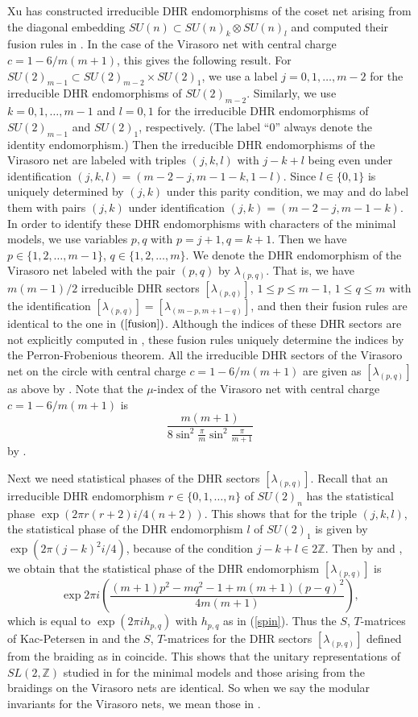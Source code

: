 \documentclass[12pt]{article}
\def\la{\lambda}
\def\Z{{\mathbb Z}}
\begin{document}
Xu has constructed irreducible DHR endomorphisms of the coset net arising
from the diagonal embedding $SU(n)\subset SU(n)_k\otimes SU(n)_l$
and computed their fusion rules in \cite[Theorem 4.6]{X4}.  In the
case of the Virasoro net with central charge $c=1-6/m(m+1)$,
this gives the following result.  For 
$SU(2)_{m-1}\subset SU(2)_{m-2}\times SU(2)_1$, we use a label
$j=0,1,\dots,m-2$ for the irreducible DHR endomorphisms of $SU(2)_{m-2}$.
Similarly, we use $k=0,1,\dots,m-1$ and $l=0,1$ for the
irreducible DHR endomorphisms of $SU(2)_{m-1}$ and $SU(2)_1$,
respectively.  (The label ``0'' always denote the identity endomorphism.)
Then the irreducible DHR endomorphisms of the Virasoro net are
labeled with triples $(j,k,l)$ with $j-k+l$ being even under
identification $(j,k,l)=(m-2-j,m-1-k,1-l)$.  
Since $l\in\{0,1\}$ is uniquely determined by $(j,k)$ under this
parity condition, we may and do label them with pairs $(j,k)$ under
identification $(j,k)=(m-2-j,m-1-k)$.  In order to identify
these DHR endomorphisms with characters of the minimal models,
we use variables $p,q$ with $p=j+1, q=k+1$.  Then we have
$p\in\{1,2,\dots,m-1\}$, $q\in\{1,2,\dots,m\}$.  We denote the
DHR endomorphism of the Virasoro net labeled with the pair $(p,q)$ 
by $\la_{(p,q)}$.  That is, we have $m(m-1)/2$ irreducible DHR sectors
$[\la_{(p,q)}]$, $1\le p\le m-1$, $1\le q\le m$ with the identification
$[\la_{(p,q)}]=[\la_{(m-p,m+1-q)}]$, and then their fusion rules are
identical to the one in $(\ref{fusion})$.
Although the indices of these DHR sectors are not explicitly computed
in \cite{X4}, these fusion rules uniquely determine the indices by the
Perron-Frobenious theorem.
All the irreducible DHR sectors of the Virasoro net on the circle with
central charge $c=1-6/m(m+1)$ are given as $[\la_{(p,q)}]$ as above
by \cite[Proposition 3.7]{X5}.  Note that the $\mu$-index of 
the Virasoro net with central charge $c=1-6/m(m+1)$ is
$$\frac{m(m+1)}{8\sin^2{\frac{\pi}{m}} \sin^2{\frac{\pi}{m+1}}}$$
by \cite[Lemma 3.6]{X5}.

Next we need statistical phases of the DHR sectors $[\la_{(p,q)}]$.
Recall that an irreducible DHR endomorphism $r\in\{0,1,\dots,n\}$
of $SU(2)_n$ has the statistical phase
$\exp (2\pi r(r+2)i/4(n+2))$.  This shows that for the triple
$(j,k,l)$, the statistical phase of the DHR endomorphism $l$ of
$SU(2)_1$ is given by $\exp (2\pi (j-k)^2 i/4)$, because of the
condition $j-k+l\in 2\Z$.  Then by \cite[Theorem 4.6.(i)]{X6}
and \cite[Lemma 6.1]{BE4}, we obtain that
the statistical phase of the DHR endomorphism $[\la_{(p,q)}]$ is 
$$\exp 2\pi i \left(\dfrac{(m+1)p^2-mq^2-1+m(m+1)(p-q)^2}{4m(m+1)}\right),$$
which is equal to $\exp(2\pi ih_{p,q})$
with $h_{p,q}$ as in (\ref{spin}).
Thus the $S$, $T$-matrices of Kac-Petersen
in \cite[Section 10.6]{DMS} and the $S$, $T$-matrices for the DHR sectors
$[\la_{(p,q)}]$ defined from the braiding as in \cite{R1} coincide.
This shows that the unitary representations of $SL(2,\Z)$ 
studied in \cite{CIZ} for the minimal models and those arising 
from the braidings on the Virasoro nets are identical.  
So when we say the modular invariants for the
Virasoro nets, we mean those in \cite{CIZ}.
\end{document}
